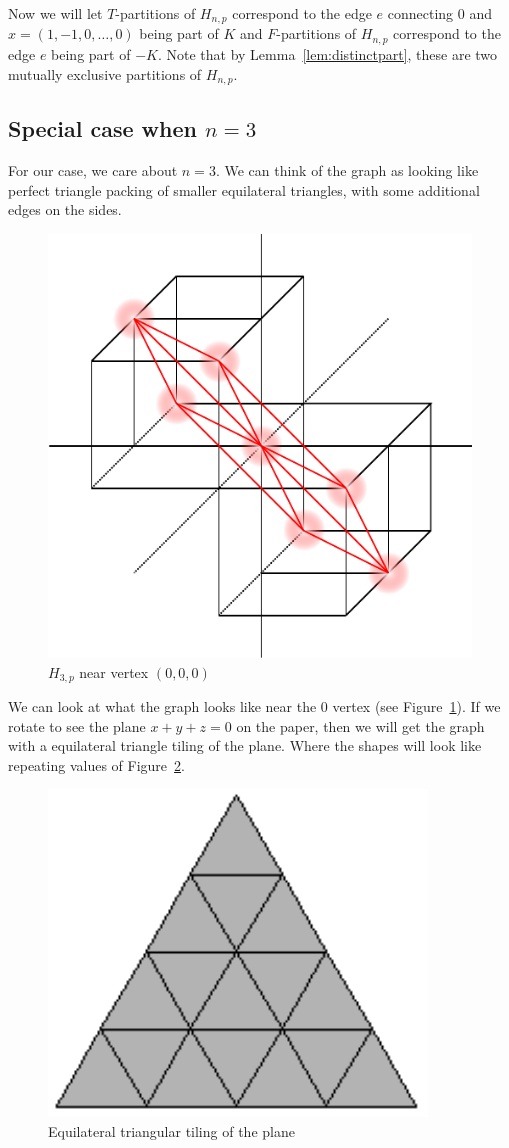 \documentclass[runningheads,a4paper]{llncs}
\begin{document}
Now we will let $T$-partitions of $H_{n,p}$ correspond to the edge $e$ connecting $0$ and $x = (1, -1, 0, \dots, 0)$ being part of $K$ and $F$-partitions of $H_{n,p}$ correspond to the edge $e$ being part of $-K$. Note that by Lemma~\ref{lem:distinctpart}, these are two mutually exclusive partitions of $H_{n,p}$.

\subsection{Special case when $n=3$}

For our case, we care about $n=3$. We can think of the graph as looking like perfect triangle packing of smaller equilateral triangles, with some additional edges on the sides.

\begin{figure}[h]
\label{fig:H3at0}
\centering
\includegraphics[width=0.5\linewidth]{h3at0.pdf}
\caption{$H_{3,p}$ near vertex $(0,0,0)$}
\end{figure}

We can look at what the graph looks like near the 0 vertex (see Figure~\ref{fig:H3at0}).
If we rotate to see the plane $x + y + z = 0$ on the paper, then we will get the graph with a equilateral triangle tiling of the plane. Where the shapes will look like repeating values of Figure~\ref{fig:triangletiling}.

\begin{figure}[h]
\label{fig:triangletiling}
\centering
\includegraphics[width=0.2\linewidth]{EdgePartitionPic1.pdf}
\caption{Equilateral triangular tiling of the plane}
\end{figure}
\end{document}
